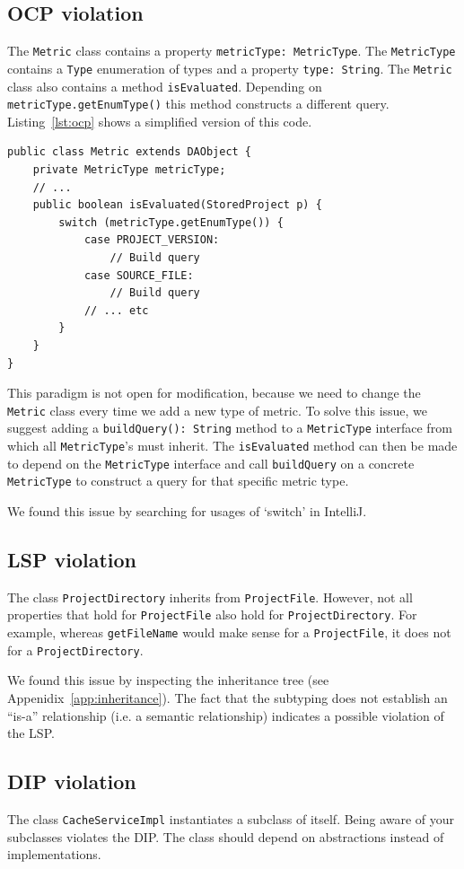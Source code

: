 \documentclass{article}
\begin{document}
\subsection{OCP violation}
The \verb|Metric| class contains a property \verb|metricType: MetricType|. The \verb|MetricType| contains a \verb|Type| enumeration of types and a property \verb|type: String|. The \verb|Metric| class also contains a method \verb|isEvaluated|. Depending on \verb|metricType.getEnumType()| this method constructs a different query. Listing~\ref{lst:ocp} shows a simplified version of this code.

\begin{lstlisting}[caption=OCP violation,label={lst:ocp}]
public class Metric extends DAObject {
	private MetricType metricType;
	// ...
	public boolean isEvaluated(StoredProject p) {
		switch (metricType.getEnumType()) {
			case PROJECT_VERSION:
				// Build query
			case SOURCE_FILE:
				// Build query
			// ... etc
		}
	}
}
\end{lstlisting}

This paradigm is not open for modification, because we need to change the \verb|Metric| class every time we add a new type of metric. To solve this issue, we suggest adding a \verb|buildQuery(): String| method to a \verb|MetricType| interface from which all \verb|MetricType|'s must inherit. The \verb|isEvaluated| method can then be made to depend on the \verb|MetricType| interface and call \verb|buildQuery| on a concrete \verb|MetricType| to construct a query for that specific metric type.

We found this issue by searching for usages of `switch' in IntelliJ.

\subsection{LSP violation}
The class \verb|ProjectDirectory| inherits from \verb|ProjectFile|. However, not all properties that hold for \verb|ProjectFile| also hold for \verb|ProjectDirectory|. For example, whereas \verb|getFileName| would make sense for a \verb|ProjectFile|, it does not for a \verb|ProjectDirectory|.

We found this issue by inspecting the inheritance tree (see Appenidix~\ref{app:inheritance}). The fact that the subtyping does not establish an ``is-a'' relationship (i.e. a semantic relationship) indicates a possible violation of the LSP.

\subsection{DIP violation}
The class \verb|CacheServiceImpl| instantiates a subclass of itself. Being aware of your subclasses violates the DIP. The class should depend on abstractions instead of implementations.
\end{document}
